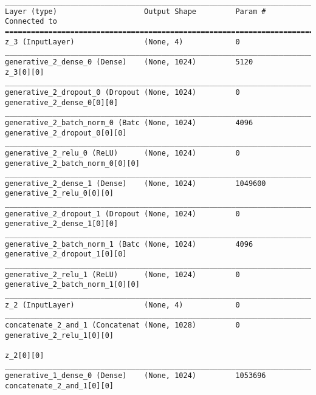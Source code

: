 \begin{lstlisting}[caption={dSprites-VLAE Decoder},captionpos=b,basicstyle=\tiny, label={lst:dsprites-vlae-decoder}]
__________________________________________________________________________________________________
Layer (type)                    Output Shape         Param #     Connected to
==================================================================================================
z_3 (InputLayer)                (None, 4)            0
__________________________________________________________________________________________________
generative_2_dense_0 (Dense)    (None, 1024)         5120        z_3[0][0]
__________________________________________________________________________________________________
generative_2_dropout_0 (Dropout (None, 1024)         0           generative_2_dense_0[0][0]
__________________________________________________________________________________________________
generative_2_batch_norm_0 (Batc (None, 1024)         4096        generative_2_dropout_0[0][0]
__________________________________________________________________________________________________
generative_2_relu_0 (ReLU)      (None, 1024)         0           generative_2_batch_norm_0[0][0]
__________________________________________________________________________________________________
generative_2_dense_1 (Dense)    (None, 1024)         1049600     generative_2_relu_0[0][0]
__________________________________________________________________________________________________
generative_2_dropout_1 (Dropout (None, 1024)         0           generative_2_dense_1[0][0]
__________________________________________________________________________________________________
generative_2_batch_norm_1 (Batc (None, 1024)         4096        generative_2_dropout_1[0][0]
__________________________________________________________________________________________________
generative_2_relu_1 (ReLU)      (None, 1024)         0           generative_2_batch_norm_1[0][0]
__________________________________________________________________________________________________
z_2 (InputLayer)                (None, 4)            0
__________________________________________________________________________________________________
concatenate_2_and_1 (Concatenat (None, 1028)         0           generative_2_relu_1[0][0]
                                                                 z_2[0][0]
__________________________________________________________________________________________________
generative_1_dense_0 (Dense)    (None, 1024)         1053696     concatenate_2_and_1[0][0]

\end{lstlisting}

